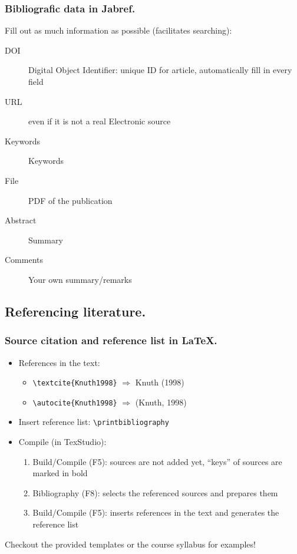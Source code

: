 \documentclass[aspectratio=169]{beamer}
\begin{document}
\begin{frame}
  \frametitle{Bibliografic data in Jabref.}

  Fill out as much information as possible (facilitates searching):

  \begin{description}
    \item[DOI] Digital Object Identifier: unique ID for article, automatically fill in every field
    \item[URL] even if it is not a real Electronic source
    \item[Keywords] Keywords
    \item[File] PDF of the publication
    \item[Abstract] Summary
    \item[Comments] Your own summary/remarks
  \end{description}

\end{frame}

\subsection{Referencing literature.}

\begin{frame}[fragile]
  \frametitle{Source citation and reference list in {\LaTeX}.}

  \begin{itemize}
    \item References in the text:

    \begin{itemize}
      \item \verb|\textcite{Knuth1998}| \(\Rightarrow\) Knuth (1998)
      \item \verb|\autocite{Knuth1998}| \(\Rightarrow\) (Knuth, 1998)
    \end{itemize}

    \item Insert reference list: \verb|\printbibliography|

    \item Compile (in TexStudio):

    \begin{enumerate}
      \item Build/Compile (F5): sources are not added yet, ``keys'' of sources are marked in bold
      \item Bibliography (F8): selects the referenced sources and prepares them 
      \item Build/Compile (F5): inserts references in the text and generates the reference list
    \end{enumerate}
  \end{itemize}

  Checkout the provided templates or the course syllabus for examples!
\end{frame}
\end{document}
